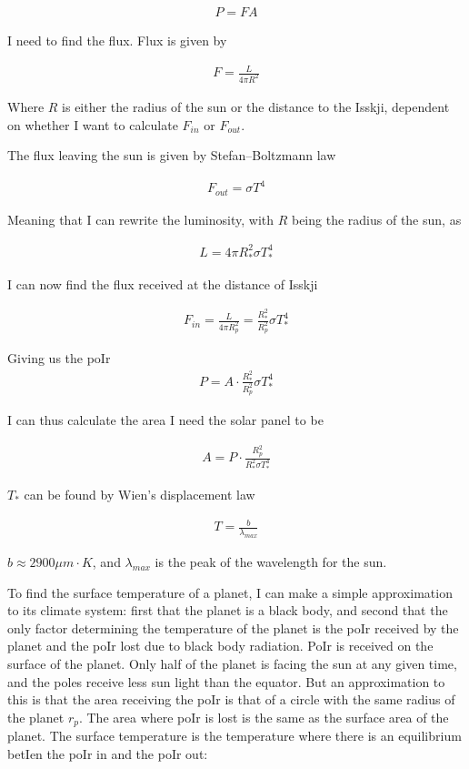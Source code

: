 \documentclass[a4paper, 10pt]{article}
\begin{document}
\begin{align}
P = FA
\end{align}

I need to find the flux. Flux is given by

\begin{align}
F = \frac{L}{4\pi R^2}
\end{align}

Where $R$ is either the radius of the sun or the distance to the Isskji, dependent on whether I want to calculate $F_{in}$ or $F_{out}$.

The flux leaving the sun is given by Stefan–Boltzmann law

\begin{align*}
F_{out} = \sigma T^4
\end{align*}

Meaning that I can rewrite the luminosity, with $R$ being the radius of the sun, as

\begin{align}
L = 4\pi R_*^2 \sigma T_*^4
\end{align}

I can now find the flux received at the distance of Isskji


\begin{align}
F_{in} = \frac{L}{4\pi R_p^2} = \frac{R_*^2}{R_p^2} \sigma T_*^4
\end{align}

Giving us the poIr
\begin{align}
P = A \cdot \frac{R_*^2}{R_p^2} \sigma T_*^4
\end{align}

I can thus calculate the area I need the solar panel to be

\begin{align}\label{eq:area}
A = P \cdot \frac{R_p^2}{R_*^2 \sigma T_*^4} 
\end{align}

$T_*$ can be found by Wien's displacement law

\begin{align}
T = \frac{b}{\lambda_{max}}
\end{align}

$b \approx 2900 \mu m \cdot K$, and $\lambda_{max}$ is the peak of the wavelength for the sun.

To find the surface temperature of a planet, I can make a simple approximation to its climate system: first that the planet is a black body, and second that the only factor determining the temperature of the planet is the poIr received by the planet and the poIr lost due to black body radiation. PoIr is received on the surface of the planet. Only half of the planet is facing the sun at any given time, and the poles receive less sun light than the equator. But an approximation to this is that the area receiving the poIr is that of a circle with the same radius of the planet $r_p$. The area where poIr is lost is the same as the surface area of the planet. The surface temperature is the temperature where there is an equilibrium betIen the poIr in and the poIr out:
\end{document}
